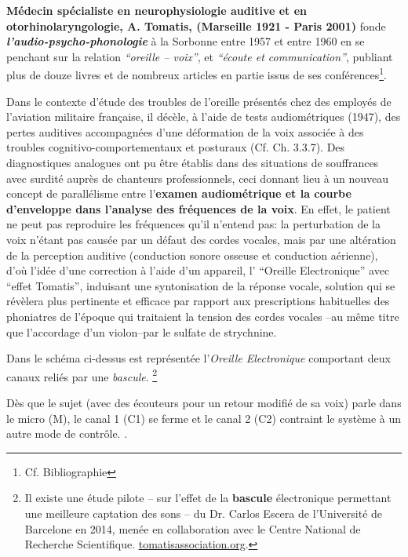 \textbf{Médecin spécialiste en neurophysiologie auditive et en
oto\-rhino\-la\-ryn\-go\-lo\-gie, A. Tomatis, (Marseille 1921 - Paris 2001) } fonde
\textit{\textbf{l'audio-psycho-phonologie }} à la Sorbonne entre
1957 et entre 1960 en  se penchant sur la relation
\textit{``oreille -- voix''}, et  \textit{``écoute
et communication''}, publiant plus de douze livres et de nombreux
articles en partie issus de ses
conférences\footnote{Cf. Bibliographie}.


Dans le contexte d'étude des troubles de
l'oreille présentés chez des employés de l'aviation militaire
française, il décèle, à l'aide
de tests audiométriques
 (1947), des pertes auditives accompagnées d'une
déformation de la voix associée à des troubles
cognitivo-comportementaux et posturaux (Cf. Ch. 3.3.7).
Des diagnostiques analogues ont pu être établis dans des situations
de souffrances avec surdité auprès de chanteurs professionnels,
ceci donnant lieu
à un nouveau concept de
parallélisme entre l'\textbf{examen audiométrique et la courbe
d'enveloppe dans l'analyse des fréquences de la voix}.
En effet, le patient ne peut pas reproduire les fréquences qu'il
n'entend pas:
la perturbation de la voix n'étant pas causée par un défaut des cordes
vocales, mais par une altération de la perception auditive (conduction
sonore osseuse et conduction aérienne), d'où
l'idée d'une correction à l'aide d'un appareil, l' ``Oreille
Electronique'' avec ``effet Tomatis'', induisant
une syntonisation de la réponse vocale, solution qui se révèlera plus pertinente et efficace par rapport aux prescriptions habituelles des phoniatres de
l'époque qui traitaient la tension des cordes vocales --au même titre que
l'accordage d'un violon--par le sulfate de
strychnine.

Dans le schéma ci-dessus est représentée l'\textit{Oreille Electronique}
comportant deux canaux reliés par une
\textit{bascule}. \autocite{escera-key}\footnote{Il existe une étude pilote -- sur l'effet de la \textbf{bascule} \label{bascule} électronique permettant une meilleure
captation des sons -- du Dr. Carlos Escera
de l'Université de Barcelone en 2014, menée en collaboration avec le
Centre National de Recherche Scientifique.
\href{http://tomatisassociation.org/scientific-validation-of-the-tomatis-effect-
eeg-recordings-of-sound-from-brainstem-to-cerebral-cortex-encoding-university-of
-barcelona-2014/}{tomatisassociation.org}.}

Dès que le sujet (avec
des écouteurs pour un retour modifié de sa voix) parle
dans le micro (M), le canal 1 (C1) se ferme et  le canal 2 (C2) contraint le
système à un autre mode de contrôle.
.

